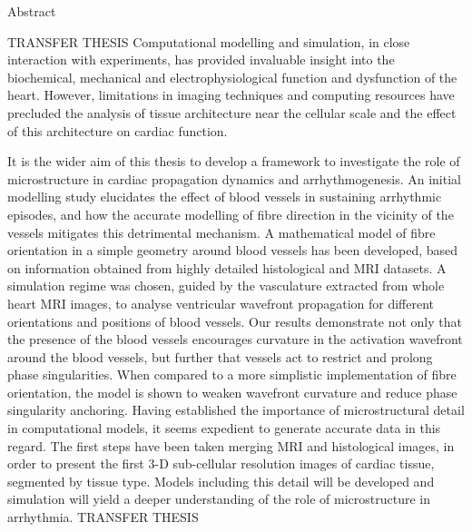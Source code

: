 {
\Large
\noindent\makebox[3in][l]{\xauthor}\hfill{} \vskip 1pt
\makebox[3in][l]{\xcollege}\hfill\makebox[3in][r]{\xterm}
}

\vskip 1cm

{
\LARGE \bf
\begin{center}
{\xtitle}
\end{center}
}

{
\large\bf
\begin{center}
Abstract
\end{center}
}

\setlength{\baselineskip}{16truept}
TRANSFER THESIS
Computational modelling and simulation, in close interaction with experiments, has provided invaluable insight into the biochemical, mechanical and electrophysiological function and dysfunction of the heart. However, limitations in imaging techniques and computing resources have precluded the analysis of tissue architecture near the cellular scale and the effect of this architecture on cardiac function.

It is the wider aim of this thesis to develop a framework to investigate the role of microstructure in cardiac propagation dynamics and arrhythmogenesis. An initial modelling study elucidates the effect of blood vessels in sustaining arrhythmic episodes, and how the accurate modelling of fibre direction in the vicinity of the vessels mitigates this detrimental mechanism. A mathematical model of fibre orientation in a simple geometry around blood vessels has been developed, based on information obtained from highly detailed histological and MRI datasets. A simulation regime was chosen, guided by the vasculature extracted from whole heart MRI images, to analyse ventricular wavefront propagation for different orientations and positions of blood vessels. Our results demonstrate not only that the presence of the blood vessels encourages curvature in the activation wavefront around the blood vessels, but further that vessels act to restrict and prolong phase singularities. When compared to a more simplistic implementation of fibre orientation, the model is shown to weaken wavefront curvature and reduce phase singularity anchoring. Having established the importance of microstructural detail in computational models, it seems expedient to generate accurate data in this regard. The first steps have been taken merging MRI and histological images, in order to present the first 3-D sub-cellular resolution images of cardiac tissue, segmented by tissue type. Models including this detail will be developed and simulation will yield a deeper understanding of the role of microstructure in arrhythmia.
TRANSFER THESIS


